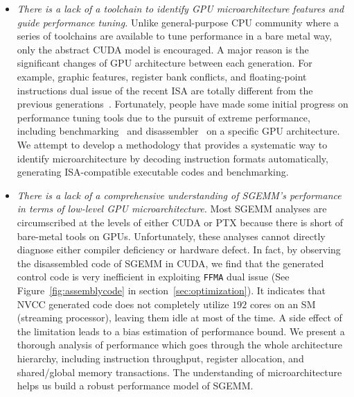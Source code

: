 \begin{itemize}
\item {\em There is a lack of a toolchain to identify GPU microarchitecture features and guide performance tuning.}
    Unlike general-purpose CPU community where a series of toolchains are available to tune performance in a bare metal
        way, only the abstract CUDA model is encouraged. A major reason is the significant changes of GPU architecture
        between each generation. For example, graphic features, register bank conflicts, and floating-point instructions dual
        issue of the recent ISA are totally different from the previous generations~\cite{fermi}. Fortunately, people have made
        some initial progress on performance tuning tools due to the pursuit of extreme performance, including
        benchmarking~\cite{mei, volkov, wong} and disassembler~\cite{asfermi,bernstein2012usable,decuda,maxas} on a specific GPU architecture. We attempt to develop a methodology that provides a systematic way to identify microarchitecture by decoding instruction formats automatically, generating ISA-compatible executable codes and benchmarking.
\item {\em There is a lack of a comprehensive understanding of SGEMM's performance in terms of low-level GPU microarchitecture.} Most SGEMM analyses are circumscribed at the levels of either CUDA or PTX because there is short of bare-metal tools on GPUs. Unfortunately, these analyses cannot directly diagnose either compiler deficiency or hardware defect. In fact, by observing the disassembled code of SGEMM in CUDA, we find that the generated control code is very inefficient in exploiting {\tt FFMA} dual issue (See Figure~\ref{fig:assemblycode} in section~\ref{sec:optimization}). It indicates that NVCC generated code does not completely utilize $192$ cores on an SM (streaming processor), leaving them idle at most of the time. A side effect of the limitation leads to a bias estimation of performance bound. We present a thorough analysis of performance which goes through the whole architecture hierarchy, including instruction throughput, register allocation, and shared/global memory transactions. The understanding of microarchitecture helps us build a robust performance model of SGEMM.
\end{itemize}

